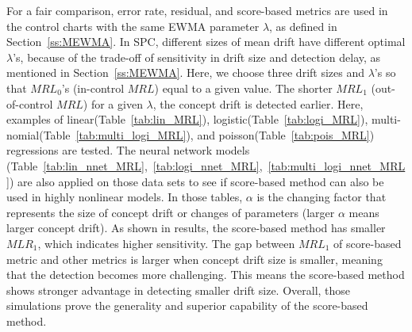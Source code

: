 \documentclass[twoside,11pt]{article}
\begin{document}
For a fair comparison, error rate, residual, and score-based metrics are used in the control charts with the same EWMA parameter $\lambda$, as defined in Section~\ref{ss:MEWMA}. In SPC, different sizes of mean drift have different optimal $ \lambda$'s, because of the trade-off of sensitivity in drift size and detection delay, as mentioned in Section~\ref{ss:MEWMA}. Here, we choose three drift sizes and $ \lambda$'s so that $MRL_0$'s (in-control $MRL$) equal to a given value. The shorter $MRL_1$ (out-of-control $MRL$) for a given $ \lambda$, the concept drift is detected earlier. Here, examples of linear(Table~\ref{tab:lin_MRL}), logistic(Table~\ref{tab:logi_MRL}), multi-nomial(Table~\ref{tab:multi_logi_MRL}), and poisson(Table~\ref{tab:pois_MRL}) regressions are tested. The neural network models (Table~\ref{tab:lin_nnet_MRL},~\ref{tab:logi_nnet_MRL},~\ref{tab:multi_logi_nnet_MRL}) are also applied on those data sets to see if score-based method can also be used in highly nonlinear models. In those tables, $ \alpha$ is the changing factor that represents the size of concept drift or changes of parameters (larger $ \alpha$ means larger concept drift). As shown in results, the score-based method has smaller $MLR_1$, which indicates higher sensitivity. The gap between $MRL_1$ of score-based metric and other metrics is larger when concept drift size is smaller, meaning that the detection becomes more challenging. This means the score-based method shows stronger advantage in detecting smaller drift size. Overall, those simulations prove the generality and superior capability of the score-based method.
\end{document}

